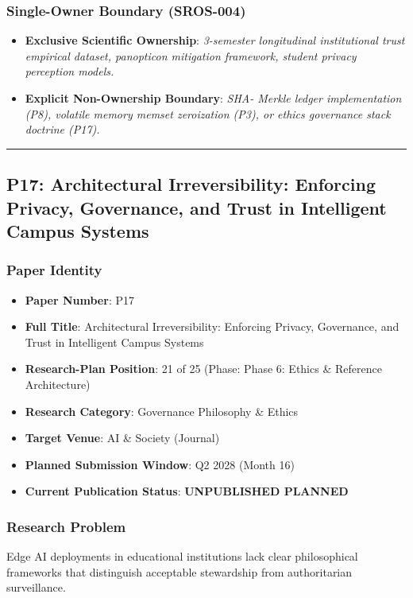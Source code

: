 \documentclass[11pt,letterpaper]{article}
\begin{document}
\subsubsection{Single-Owner Boundary (SROS-004)}
\begin{itemize}[leftmargin=*]
    \item \textbf{Exclusive Scientific Ownership}: \textit{3-\allowbreak semester longitudinal institutional trust empirical dataset, panopticon mitigation framework, student privacy perception models.}
    \item \textbf{Explicit Non-Ownership Boundary}: \textit{SHA- Merkle ledger implementation (P8), volatile memory memset zeroization (P3), or ethics governance stack doctrine (P17).}
\end{itemize}

\vspace{0.4cm}
\hrule

\subsection{P17: Architectural Irreversibility: Enforcing Privacy, Governance, and Trust in Intelligent Campus Systems}
\label{sec:profile_p17}

\subsubsection{Paper Identity}
\begin{itemize}[leftmargin=*]
    \item \textbf{Paper Number}: P17
    \item \textbf{Full Title}: Architectural Irreversibility: Enforcing Privacy, Governance, and Trust in Intelligent Campus Systems
    \item \textbf{Research-Plan Position}: 21 of 25 (Phase: Phase 6: Ethics \& Reference Architecture)
    \item \textbf{Research Category}: Governance Philosophy \& Ethics
    \item \textbf{Target Venue}: AI \& Society (Journal)
    \item \textbf{Planned Submission Window}: Q2 2028 (Month 16)
    \item \textbf{Current Publication Status}: \textbf{UNPUBLISHED PLANNED}
\end{itemize}

\subsubsection{Research Problem}
Edge AI deployments in educational institutions lack clear philosophical frameworks that distinguish acceptable stewardship from authoritarian surveillance.
\end{document}
